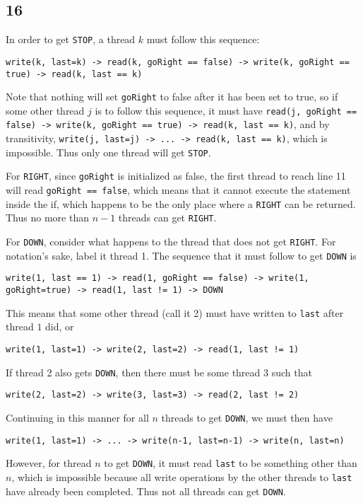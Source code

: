 \documentclass{article}
\begin{document}
\subsection*{16}
In order to get \verb|STOP|, a thread $k$ must follow this sequence:
\begin{verbatim}
write(k, last=k) -> read(k, goRight == false) -> write(k, goRight == true) -> read(k, last == k)
\end{verbatim}
Note that nothing will set \verb|goRight| to false after it has been set to true, so if some other thread $j$ is to follow this sequence, it must have \verb|read(j, goRight == false) -> write(k, goRight == true) -> read(k, last == k)|, and by transitivity, \verb|write(j, last=j) -> ... -> read(k, last == k)|, which is impossible. Thus only one thread will get \verb|STOP|.

For \verb|RIGHT|, since \verb|goRight| is initialized as false, the first thread to reach line 11 will read \verb|goRight == false|, which means that it cannot execute the statement inside the if, which happens to be the only place where a \verb|RIGHT| can be returned. Thus no more than $n-1$ threads can get \verb|RIGHT|.

For \verb|DOWN|, consider what happens to the thread that does not get \verb|RIGHT|. For notation's sake, label it thread 1. The sequence that it must follow to get \verb|DOWN| is 
\begin{verbatim}
write(1, last == 1) -> read(1, goRight == false) -> write(1, goRight=true) -> read(1, last != 1) -> DOWN
\end{verbatim}
This means that some other thread (call it 2) must have written to \verb|last| after thread $1$ did, or 
\begin{verbatim}
write(1, last=1) -> write(2, last=2) -> read(1, last != 1)
\end{verbatim}
If thread 2 also gets \verb|DOWN|, then there must be some thread 3 such that 
\begin{verbatim}
write(2, last=2) -> write(3, last=3) -> read(2, last != 2)
\end{verbatim}
Continuing in this manner for all $n$ threads to get \verb|DOWN|, we must then have 
\begin{verbatim}
write(1, last=1) -> ... -> write(n-1, last=n-1) -> write(n, last=n)
\end{verbatim}
However, for thread $n$ to get \verb|DOWN|, it must read \verb|last| to be something other than $n$, which is impossible because all write operations by the other threads to \verb|last| have already been completed. Thus not all threads can get \verb|DOWN|.
\end{document}
